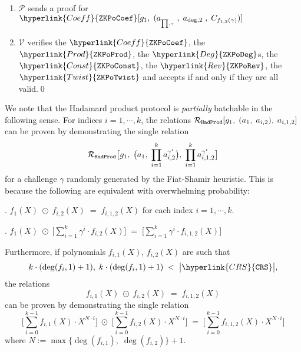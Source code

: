 \documentclass[11pt, lettersize, notitlepage, leqno, footskip=0.6cm]{article}
\newcommand{\mc}{\mathcal}
\newcommand{\mP}{\mc{P}}
\newcommand{\V}{\mc{V}}
\newcommand{\vs}{\vspace{-0.15cm}}
\newcommand{\noin}{\noindent}
\newcommand{\op}{overwhelming probability}
\numberwithin{equation}{section}
\begin{document}
\begin{mdframed}
\begin{enumerate}[wide, labelwidth=!, labelindent=0pt]
\item $\mP$ sends a proof for $\hyperlink{Coeff}{\tt{ZKPoCoef}}[g_1,\;( a_{_{\prod , \gamma}}\;, \;a_{\deg,2}\;,\; C_{f_{1,2}(\gamma)})]$

\item $\V$ verifies the $\hyperlink{Coeff}{\tt{ZKPoCoef}}$, the $\hyperlink{Prod}{\tt{ZKPoProd}}$, the $\hyperlink{Deg}{\tt{ZKPoDeg}}$s, the $\hyperlink{Const}{\tt{ZKPoConst}}$, the $\hyperlink{Rev}{\tt{ZKPoRev}}$, the $\hyperlink{Twist}{\tt{ZKPoTwist}}$ and accepts if and only if they are all valid.\qed

\end{enumerate}

\end{mdframed}

\bigskip

We note that the Hadamard product protocol is \textit{partially} batchable in the following sense. For indices $i=1,\cdots, k$, the relations $\mc{R}_{\tt{HadProd}}[g_1,\;(a_{1},\;a_{i,2}),\; a_{i,1,2}]$ can be proven by demonstrating the single relation \vs $$ \mc{R}_{\tt{HadProd}}\big [g_1,\;\big(a_1 ,\; \prod\limits_{i=1}^{k} a_{i,2}^{\gamma^i} \big),\; \prod\limits_{i=1}^{k} a_{i,1,2}^{\gamma^{i}} \big]  $$ for a challenge $\gamma$ randomly generated by the Fiat-Shamir heuristic. This is because the following are equivalent with \op: \vspace{2mm}

\noin 1. $f_1(X)\;\odot \; f_{i,2}(X) \;=\; f_{i,1,2}(X)$ for each index $i=1,\cdots,k$. \vspace{1mm} 

\noin 2. $ f_{1}(X) \;\odot\; \big[\sum\limits_{i=1}^k \gamma^i\cdot f_{i,2}(X) \big]\;=\;  \big[\sum\limits_{i=1}^k \gamma^{i}\cdot f_{i,1,2}(X) \big]$  \vspace{2mm}

Furthermore, if polynomials $f_{i,1}(X)$, $f_{i,2}(X)$ are such that \vs $$k\cdot (\deg(f_i,1)+1),\;k\cdot (\deg(f_i,1)+1) \; < \;  \big| \hyperlink{CRS}{\tt{CRS}} \big|,$$ the relations \vs $$ f_{i,1}(X) \;\odot\; f_{i,2}(X) \; = \; f_{i,1,2}(X)  $$ can be proven by demonstrating the single relation \vs $$ \big[\sum\limits_{i=0}^{k-1} f_{i,1}(X)\cdot X^{N\cdot i} \big] \; \odot \; \big[\sum\limits_{i=0}^{k-1} f_{i,2}(X)\cdot X^{N\cdot i}\big] \; = \; \big[\sum\limits_{i=0}^{k-1} f_{i,1,2}(X)\cdot X^{N \cdot i} \big] $$ where $N:= \max\{\deg(f_{i,1}),\;\deg(f_{i,2})  \} + 1$.
\end{document}
